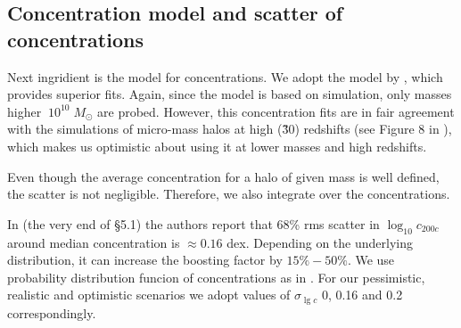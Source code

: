 \subsection{Concentration model and scatter of concentrations}

Next ingridient is the model for concentrations. We adopt the model by \cite{2014arXiv1407.4730D}, which provides superior fits. Again, since the model is based on simulation, only masses higher $~10^{10}\;M_\odot$ are probed. However, this concentration fits are in fair agreement with the simulations of micro-mass halos at high (\~30) redshifts (see Figure 8 in \cite{2014arXiv1407.4730D}), which makes us optimistic about using it at lower masses and high redshifts.

Even though the average concentration for a halo of given mass is well defined, the scatter is not negligible. Therefore, we also integrate over the concentrations.

In \cite{2014arXiv1407.4730D} (the very end of \S5.1) the authors report that 68\% rms scatter in $\log_{10}c_{200c}$ around median concentration is $\approx 0.16$ dex. Depending on the underlying distribution, it can increase the boosting factor by $15\%-50\%$. We use probability distribution funcion of concentrations as in \cite{2014arXiv1412.4308M}. For our pessimistic, realistic and optimistic scenarios we adopt values of $\sigma_{\lg c}$ 0, 0.16 and 0.2 correspondingly.